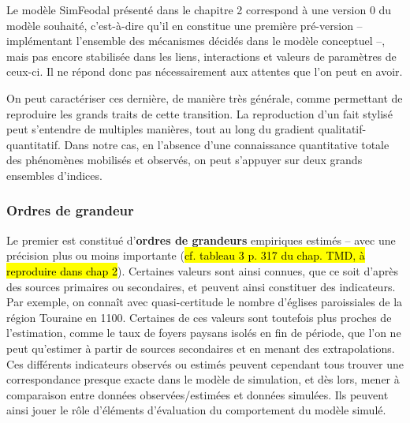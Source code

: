 \documentclass[12pt, a4paper, oneside]{book}
\begin{document}
	Le modèle SimFeodal présenté dans le chapitre 2 correspond à une \og version 0\fg{} du modèle souhaité, c'est-à-dire qu'il en constitue une première pré-version -- implémentant l'ensemble des mécanismes décidés dans le modèle conceptuel --, mais pas encore stabilisée dans les liens, interactions et valeurs de paramètres de ceux-ci.
	Il ne répond donc pas nécessairement aux attentes que l'on peut en avoir.
	
	On peut caractériser ces dernière, de manière très générale, comme permettant de reproduire les grands traits de cette transition.
	La reproduction d'un fait stylisé peut s'entendre de multiples manières, tout au long du gradient qualitatif-quantitatif.
	Dans notre cas, en l'absence d'une connaissance quantitative totale des phénomènes mobilisés et observés, on peut s'appuyer sur deux grands ensembles d'\og indices\fg{}.
	
	\subsubsection{Ordres de grandeur}
	Le premier est constitué d'\textbf{ordres de grandeurs} empiriques estimés -- avec une précision plus ou moins importante (\hl{cf. tableau 3 p. 317 du chap. TMD, à reproduire dans chap 2}). Certaines valeurs sont ainsi connues, que ce soit d'après des sources primaires ou secondaires, et peuvent ainsi constituer des \og indicateurs\fg{}. Par exemple, on connaît avec quasi-certitude le nombre d'églises paroissiales de la région Touraine en 1100. Certaines de ces valeurs sont toutefois plus proches de l'estimation, comme le taux de foyers paysans isolés en fin de période, que l'on ne peut qu'estimer à partir de sources secondaires et en menant des extrapolations. Ces différents indicateurs observés ou estimés peuvent cependant tous trouver une correspondance presque exacte dans le modèle de simulation, et dès lors, mener à comparaison entre données observées/estimées et données simulées. Ils peuvent ainsi jouer le rôle d'éléments d'évaluation du comportement du modèle simulé.
	
\end{document}

